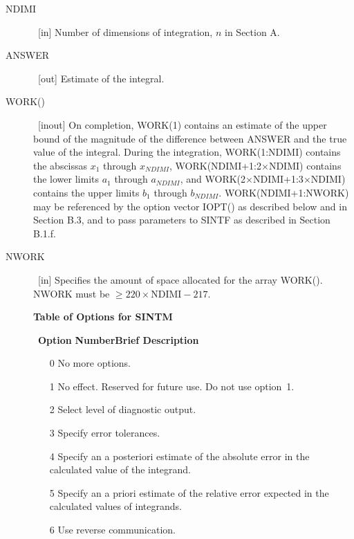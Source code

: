 \documentclass[twoside]{MATH77}
\begin{document}
\begin{description}
\item[NDIMI] \  [in] Number of dimensions of integration, $n$ in Section A.

\item[ANSWER] \  [out] Estimate of the integral.

\item[WORK()] \  [inout] On completion, WORK(1) contains an estimate of the
upper bound of the magnitude of the difference between ANSWER and the true
value of the integral. During the integration, WORK(1:NDIMI)
contains the abscissas $x_1$ through $x_{NDIMI}$, WORK(NDIMI+1:2$\times $NDIMI)
contains the lower limits $a_1$ through $a_{NDIMI}$,
and WORK(2$\times $NDIMI+1:3$\times $NDIMI) contains the
upper limits $b_1$ through $b_{NDIMI}$.
WORK(NDIMI+1:NWORK) may be referenced by the option vector IOPT() as
described below and in Section B.3, and to pass parameters to SINTF as
described in Section B.1.f.

\item[NWORK] \  [in] Specifies the amount of space allocated for the array
WORK(). NWORK must be $\geq 220\times \text{NDIMI} - 217.$

\pagebreak
\centerline{{\bf Table of Options for SINTM}\hspace{.5in}}
\ {\bf Option}\newline
{\bf Number\hspace{.3in}Brief Description}\vspace{-3pt}
\begin{itemize}
\item[0]  No more options.

\item[1]  No effect. Reserved for future use. Do not use option~1.

\item[2]  Select level of diagnostic output.

\item[3]  Specify error tolerances.

\item[4]  Specify an a posteriori estimate of the absolute error in the
calculated value of the integrand.

\item[5]  Specify an a priori estimate of the relative error expected in the
calculated values of integrands.

\item[6]  Use reverse communication.


\end{itemize}
\end{description}
\end{document}
